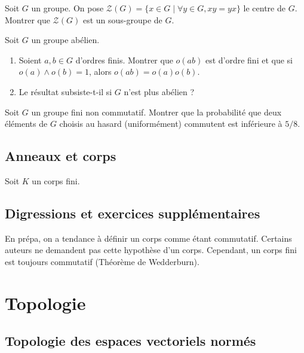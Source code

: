 \documentclass[12pt,a4paper]{exo_book}
\begin{document}
\begin{exo}
    Soit $G$ un groupe. On pose $\mathcal{Z}(G) = \{x \in G \mid \forall y\in G, xy=yx\}$ le centre de $G$. Montrer que $\mathcal{Z}(G)$ est un sous-groupe de $G$.
\end{exo}

\begin{exo}
    Soit $G$ un groupe abélien.
    \begin{enumerate}
        \item Soient $a,b \in G$ d'ordres finis. Montrer que $o(ab)$ est d'ordre fini et que si $o(a) \wedge o(b) = 1$, alors $o(ab)=o(a)o(b)$.
        \item Le résultat subsiste-t-il si $G$ n'est plus abélien ?
    \end{enumerate}
\end{exo}

\begin{exo}
    Soit $G$ un groupe fini non commutatif. Montrer que la probabilité que deux éléments de $G$ choisis au hasard (uniformément) commutent est inférieure à $5/8$.
\end{exo}

\section{Anneaux et corps}

\begin{exo}
    Soit $K$ un corps fini.
\end{exo}

\section{Digressions et exercices supplémentaires}

En prépa, on a tendance à définir un corps comme étant commutatif. Certains auteurs ne demandent pas cette hypothèse d'un corps. Cependant, un corps fini est toujours commutatif (Théorème de Wedderburn).



\chapter{Topologie}

\section{Topologie des espaces vectoriels normés}
\end{document}
